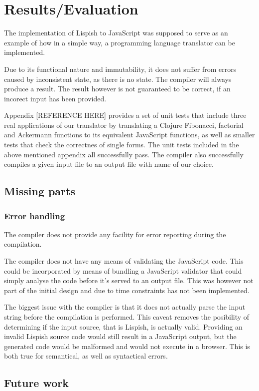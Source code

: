 \chapter{Results/Evaluation}
The implementation of Lispish to JavaScript was supposed to serve as an example of how in a simple way, a programming language translator can be implemented.

Due to its functional nature and immutability, it does not suffer from errors caused by inconsistent state, as there is no state. The compiler will always produce a result. The result however is not guaranteed to be correct, if an incorect input has been provided. 

Appendix [REFERENCE HERE] provides a set of unit tests that include three real applications of our translator by translating a Clojure Fibonacci, factorial and Ackermann functions to its equivalent JavaScript functions, as well as smaller tests that check the correctnes of single forms.
The unit tests included in the above mentioned appendix all successfully pass.
The compiler also successfully compiles a given input file to an output file with name of our choice. 

\section{Missing parts}
\subsection{Error handling}
The compiler does not provide any facility for error reporting during the compilation.

The compiler does not have any means of validating the JavaScript code. This could be incorporated by means of bundling a JavaScript validator that could simply analyse the code before it's served to an output file. This was however not part of the initial design and due to time constraints has not been implemented.

The biggest issue with the compiler is that it does not actually parse the input string before the compilation is performed. This caveat removes the posibility of determining if the input source, that is Lispish, is actually valid. 
Providing an invalid Lispish source code would still result in a JavaScript output, but the generated code would be malformed and would not execute in a browser. This is both true for semantical, as well as syntactical errors.

\section{Future work}
